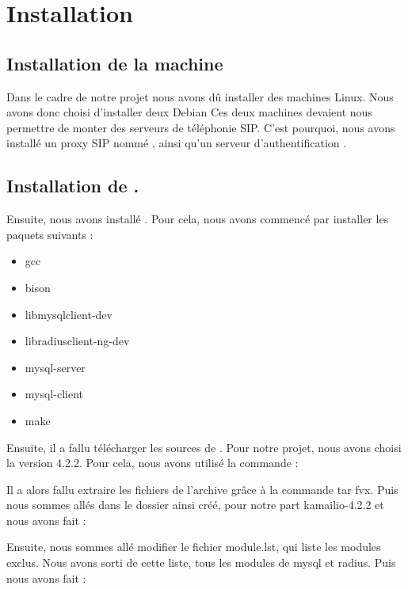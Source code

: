 \section{Installation}
\subsection{Installation de la machine}
Dans le cadre de notre projet nous avons dû installer des machines Linux. Nous avons donc choisi d'installer deux Debian \todo
Ces deux machines devaient nous permettre de monter des serveurs de téléphonie SIP.
C'est pourquoi, nous avons installé un proxy SIP nommé \kam, ainsi qu'un serveur d'authentification \frad.
\subsection{Installation de \kam.}
Ensuite, nous avons installé \kam.
Pour cela, nous avons commencé par installer les paquets suivants :
\begin{itemize}
	\item{gcc}
	\item{bison}
	\item{libmysqlclient-dev}
	\item{libradiusclient-ng-dev}
	\item{mysql-server}
	\item{mysql-client}
	\item{make}
\end{itemize}
Ensuite, il a fallu télécharger les sources de \kam. Pour notre projet, nous avons choisi la version 4.2.2.
Pour cela, nous avons utilisé la commande :


Il a alors fallu extraire les fichiers de l'archive grâce à la commande tar fvx.
Puis nous sommes allés dans le dossier ainsi créé, pour notre part kamailio-4.2.2 et nous avons fait :


Ensuite, nous sommes allé modifier le fichier module.lst, qui liste les modules exclus.
Nous avons sorti de cette liste, tous les modules de mysql et radius.
Puis nous avons fait : 
	
